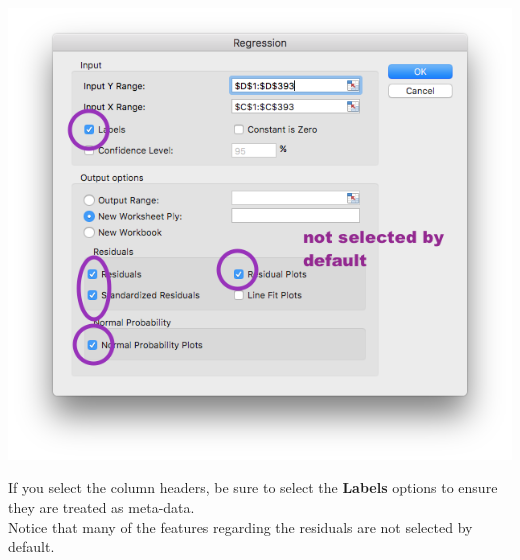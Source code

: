 \documentclass[xcolor=svgnames, handout]{beamer}
\begin{document}
\begin{frame}
\begin{center}
\includegraphics[height=.6\textheight]{regpopup}
\end{center}
If you select the column headers, be sure to select the {\bf Labels} options to ensure they are treated as meta-data.\\
\medskip
Notice that many of the features regarding the residuals are not selected by default.
\end{frame}



\end{document}
